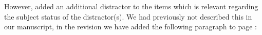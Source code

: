 \documentclass[12pt]{article}
\begin{document}
However, \textcite{mertzen} added an additional distractor to the items which is relevant regarding the subject status of the distractor(s). We had previously not described this in our manuscript, in the revision we have added the following paragraph to page \pageref{items_mertzen}:

\setcounter{exx}{4}
\end{document}
